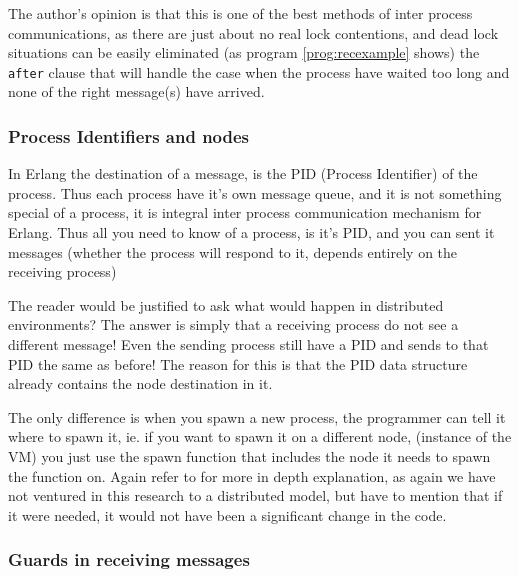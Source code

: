 \documentclass[a4paper,11pt]{report}
\begin{document}
The author's opinion is that this is one of the best methods of inter process
communications, as there are just about no real lock contentions, and dead
lock situations can be easily eliminated (as program \autoref{prog:recexample}
shows) the \texttt{after} clause that will handle the case when the
process have waited too long and none of the right message(s) have arrived.

\subsubsection{Process Identifiers and nodes}
\label{sec:PID}

In Erlang the destination of a message, is the PID (Process
Identifier) of the process. Thus each process have it's own message
queue, and it is not something special of a process, it is integral
inter process communication mechanism for Erlang. Thus all you need to
know of a process, is it's PID, and you can sent it messages (whether
the process will respond to it, depends entirely on the receiving process)

The reader would be justified to ask what would happen in distributed
environments? The answer is simply that a receiving process do not see
a different message! Even the sending process still have a PID and
sends to that PID the same as before! The reason for this is that the
PID data structure already contains the node destination in it.

The only difference is when you spawn a new process, the programmer can tell it
where to spawn it, ie. if you want to spawn it on a different node,
(instance of the VM) you just use the spawn function that includes the
node it needs to spawn the function on. Again refer to \cite{joe:09}
for more in depth explanation, as again we have not ventured in this
research to a distributed model, but have to mention that if it were
needed, it would not have been a significant change in the code.

\subsubsection{Guards in receiving messages}
\label{sec:guardRec}
\end{document}
